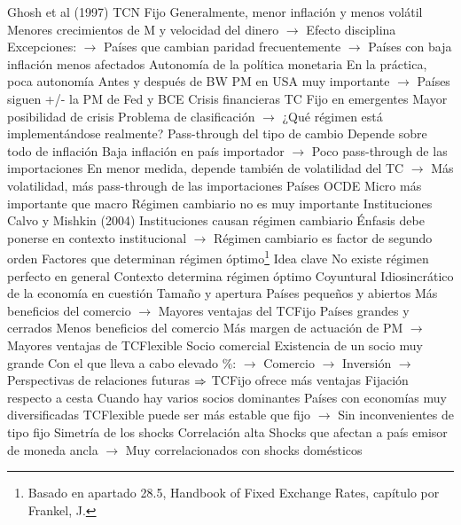 \documentclass{nuevotema}
\begin{document}
\begin{esquemal}
				\4 Ghosh et al (1997)
				\4 TCN Fijo
				\4[] Generalmente, menor inflación y menos volátil
				\4[] Menores crecimientos de M y velocidad del dinero
				\4[] $\to$ Efecto disciplina
				\4[] Excepciones:
				\4[] $\to$ Países que cambian paridad frecuentemente
				\4[] $\to$ Países con baja inflación menos afectados
			\3 Autonomía de la política monetaria
				\4 En la práctica, poca autonomía
				\4 Antes y después de BW
				\4[] PM en USA muy importante
				\4[] $\to$ Países siguen +/- la PM de Fed y BCE
			\3 Crisis financieras
				\4 TC Fijo en emergentes
				\4[] Mayor posibilidad de crisis
				\4[] Problema de clasificación
				\4[] $\to$ ¿Qué régimen está implementándose realmente?
			\3 Pass-through del tipo de cambio
				\4 Depende sobre todo de inflación
				\4[] Baja inflación en país importador
				\4[] $\to$ Poco pass-through de las importaciones
				\4 En menor medida, depende también de volatilidad del TC
				\4[] $\to$ Más volatilidad, más pass-through de las importaciones
				\4 Países OCDE
				\4[] Micro más importante que macro
				\4[] Régimen cambiario no es muy importante
			\3 Instituciones
				\4 Calvo y Mishkin (2004)
				\4[] Instituciones causan régimen cambiario
				\4[] Énfasis debe ponerse en contexto institucional
				\4[] $\to$ Régimen cambiario es factor de segundo orden
		\2 Factores que determinan régimen óptimo\footnote{Basado en apartado 28.5, Handbook of Fixed Exchange Rates, capítulo por Frankel, J.}
			\3 Idea clave
				\4 No existe régimen perfecto en general
				\4 Contexto determina régimen óptimo
				\4[] Coyuntural
				\4[] Idiosincrático de la economía en cuestión
			\3[\textsc{i}] Tamaño y apertura
				\4 Países pequeños y abiertos
				\4[] Más beneficios del comercio
				\4[] $\to$ Mayores ventajas del TCFijo
				\4 Países grandes y cerrados
				\4[] Menos beneficios del comercio
				\4[] Más margen de actuación de PM
				\4[] $\to$ Mayores ventajas de TCFlexible
			\3[\textsc{ii}] Socio comercial
				\4 Existencia de un socio muy grande
				\4[] Con el que lleva a cabo elevado \%:
				\4[] $\to$ Comercio
				\4[] $\to$ Inversión
				\4[] $\to$ Perspectivas de relaciones futuras
				\4[] $\Rightarrow$ TCFijo ofrece más ventajas
				\4 Fijación respecto a cesta
				\4[] Cuando hay varios socios dominantes
				\4 Países con economías muy diversificadas
				\4[] TCFlexible puede ser más estable que fijo
				\4[] $\to$ Sin inconvenientes de tipo fijo
			 Simetría de los shocks
				\4 Correlación alta
				\4[] Shocks que afectan a país emisor de moneda ancla
				\4[] $\to$ Muy correlacionados con shocks domésticos

\end{esquemal}
\end{document}
